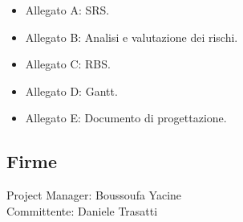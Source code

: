 \documentclass{article}
\begin{document}
\begin{flushleft}
		\begin{itemize}
			
			\item Allegato A: SRS.
			
			\item Allegato B: Analisi e valutazione dei rischi.
			
			\item Allegato C: RBS.
			
			\item Allegato D: Gantt.
			
			\item Allegato E: Documento di progettazione.
			
		\end{itemize}
		
		\subsection{Firme}
		
		Project Manager: Boussoufa Yacine\\
		
		Committente: Daniele Trasatti
		
		
		
	\end{flushleft}
	
	
	
	
	
	
	
\end{document}
